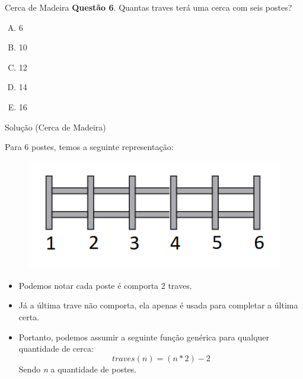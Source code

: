 \documentclass{beamer}
\begin{document}
\begin{frame}{Cerca de Madeira}
\textbf{Questão 6}. Quantas traves terá uma cerca com
seis postes?

\begin{enumerate}[(A)]
    \item 6
    \item 10
    \item 12
    \item 14
    \item 16
\end{enumerate}

\end{frame}
\begin{frame}{Solução (Cerca de Madeira)}

Para 6 postes, temos a seguinte representação:
\begin{figure}[ht]
\centering
\includegraphics[width=.6\textwidth]{postes.png}
\label{fig:exampleFig2}
\end{figure}

\begin{itemize}
    \item Podemos notar cada poste é comporta 2 traves.\\
     \item Já a última trave não comporta, ela apenas é usada para completar a última certa. \\
     \item Portanto, podemos assumir a seguinte função genérica para qualquer quantidade de cerca:
     \begin{equation*}
        traves(n) =  (n \ast 2)  - 2
     \end{equation*}
     Sendo \textit{n} a quantidade de postes.
\end{itemize}


\end{frame}
\end{document}
